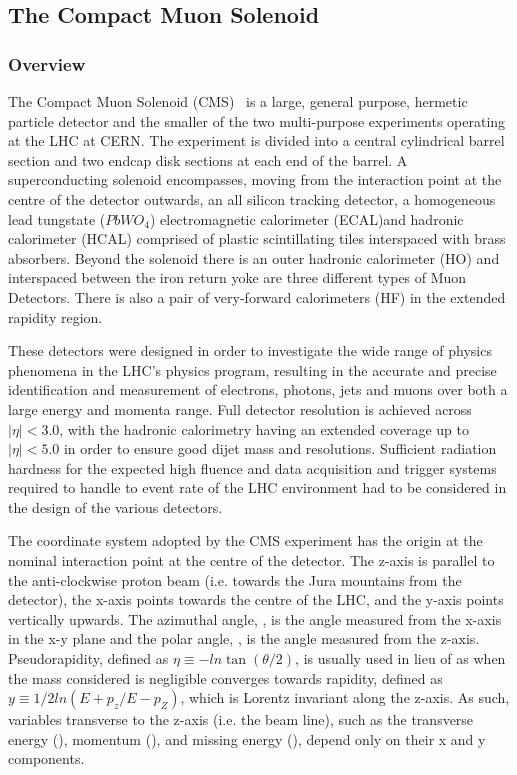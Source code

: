 \subsection{The Compact Muon Solenoid}\label{subsec:cms}
\subsubsection{Overview}
The Compact Muon Solenoid (CMS)~\cite{oldcms} is a large, general purpose, hermetic particle detector and the smaller of the two multi-purpose experiments operating at the LHC at CERN.
The experiment is divided into a central cylindrical barrel section and two endcap disk sections at each end of the barrel.
A superconducting solenoid encompasses, moving from the interaction point at the centre of the detector outwards, an all silicon tracking detector, a homogeneous lead tungstate ($PbWO_{4}$) electromagnetic calorimeter (ECAL)and hadronic calorimeter (HCAL) comprised of plastic scintillating tiles interspaced with brass absorbers.
Beyond the solenoid there is an outer hadronic calorimeter (HO) and interspaced between the iron return yoke are three different types of Muon Detectors.
There is also a pair of very-forward calorimeters (HF) in the extended rapidity region.

These detectors were designed in order to investigate the wide range of physics phenomena in the LHC's physics program, resulting in the accurate and precise identification and measurement of electrons, photons, jets and muons over both a large energy and momenta range.
Full detector resolution is achieved across $|\eta| < 3.0$, with the hadronic calorimetry having an extended coverage up to $|\eta| < 5.0$ in order to ensure good dijet mass and \MET resolutions.
Sufficient radiation hardness for the expected high fluence and data acquisition and trigger systems required to handle to event rate of the LHC environment had to be considered in the design of the various detectors.

The coordinate system adopted by the CMS experiment has the origin at the nominal interaction point at the centre of the detector. 
The z-axis is parallel to the anti-clockwise proton beam (i.e. towards the Jura mountains from the detector), the x-axis points towards the centre of the LHC, and the y-axis points vertically upwards.
The azimuthal angle, \phi, is the angle measured from the x-axis in the x-y plane and the polar angle, \theta, is the angle measured from the z-axis.
Pseudorapidity, defined as $\eta \equiv -ln\tan(\theta/2)$, is usually used in lieu of \theta as when the mass considered is negligible \eta converges towards rapidity, defined as $y \equiv	1/2 ln(E+p_{z}/E-p_{Z})$, which is Lorentz invariant along the z-axis.
As such, variables transverse to the z-axis (i.e. the beam line), such as the transverse energy (\ET), momentum (\pT), and missing energy (\MET), depend only on their x and y components.

